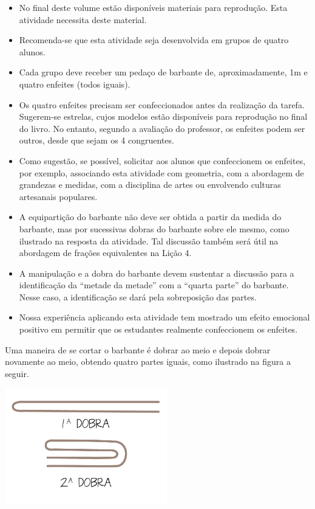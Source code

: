 \begin{multicols}{2}
\begin{orientacoes}
\begin{itemize} %
   \item No final deste volume estão disponíveis materiais para reprodução. Esta atividade necessita deste material.
   \item Recomenda-se que esta atividade seja desenvolvida em grupos de quatro alunos.
   \item       Cada grupo deve receber um pedaço de barbante de, aproximadamente, 1m e quatro enfeites (todos iguais).
    \item       Os quatro enfeites precisam ser confeccionados antes da realização da tarefa. Sugerem-se estrelas, cujos modelos estão disponíveis para reprodução no final do livro. No entanto, segundo a avaliação do professor, os enfeites podem ser outros, desde que sejam os 4 congruentes.
    \item       Como sugestão, se possível, solicitar aos alunos que confeccionem os enfeites, por exemplo, associando esta atividade com geometria, com a abordagem de grandezas e medidas, com a disciplina de artes ou envolvendo culturas artesanais populares.
    \item       A equipartição do barbante não deve ser obtida a partir da medida do barbante, mas por sucessivas dobras do barbante sobre ele mesmo, como ilustrado na resposta da atividade. Tal discussão também  será útil na abordagem de frações equivalentes na Lição 4.
    \item       A manipulação e a dobra do barbante devem sustentar a discussão para a identificação da       ``metade da metade'' com a       ``quarta parte'' do barbante. Nesse caso, a identificação se dará pela sobreposição das partes.
      \item Nossa experiência aplicando esta atividade tem mostrado um efeito emocional positivo em permitir que os estudantes realmente confeccionem os enfeites.
\end{itemize} %

\end{orientacoes}

\begin{solucao}{}{}
Uma maneira de se cortar o barbante é dobrar ao meio e depois dobrar novamente ao meio, obtendo quatro partes iguais, como ilustrado na figura a seguir.
  \begin{center}
  \includegraphics[width=200pt, keepaspectratio]{../figuras/licao01/ativ3_fig03.png}
  \end{center}
\end{solucao}
\end{multicols}

